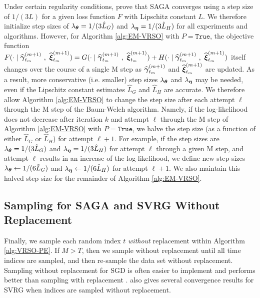 Under certain regularity conditions, \citet{Defazio:2014} prove that SAGA converges using a step size of $1/(3L)$ for a given loss function $F$ with Lipschitz constant $L$. We therefore initialize step sizes of $\lambda_{\boldsymbol{\theta}} = 1/(3 \hat L_G)$ and $\lambda_{\boldsymbol{\eta}} = 1/(3 \hat L_H)$ for all experiments and algorithms. However, for Algorithm \ref{alg:EM-VRSO} with $P = \texttt{True}$, the objective function $F(\cdot \mid \widehat {\boldsymbol{\gamma}}_{t_m}^{(m+1)} ~,~ \widehat {\boldsymbol{\xi}}_{t_m}^{(m+1)}) = G(\cdot \mid \widehat {\boldsymbol{\gamma}}_{t_m}^{(m+1)} ~,~ \widehat {\boldsymbol{\xi}}_{t_m}^{(m+1)}) + H(\cdot \mid \widehat {\boldsymbol{\gamma}}_{t_m}^{(m+1)} ~,~ \widehat {\boldsymbol{\xi}}_{t_m}^{(m+1)})$ itself changes over the course of a single M step as $\widehat {\boldsymbol{\gamma}}_{t_m}^{(m+1)}$ and $\widehat {\boldsymbol{\xi}}_{t_m}^{(m+1)}$ are updated. As a result, more conservative (i.e. smaller) step sizes $\lambda_{\boldsymbol{\theta}}$ and $\lambda_{\boldsymbol{\eta}}$ may be needed, even if the Lipschitz constant estimates $\hat L_G$ and $\hat L_H$ are accurate. We therefore allow Algorithm \ref{alg:EM-VRSO} to change the step size after each attempt $\ell$ through the M step of the Baum-Welch algorithm. Namely, if the log-likelihood does not decrease after iteration $k$ and attempt $\ell$ through the M step of Algorithm \ref{alg:EM-VRSO} with $P = \texttt{True}$, we halve the step size (as a function of either $\hat L_G$ or $\hat L_H$) for attempt $\ell+1$. For example, if the step sizes are $\lambda_{\boldsymbol{\theta}} = 1/(3 \hat L_G)$ and $\lambda_{\boldsymbol{\eta}} = 1/(3 \hat L_H)$ for attempt $\ell$ through a given M step, and attempt $\ell$ results in an increase of the log-likelihood, we define new step-sizes $\lambda_{\boldsymbol{\theta}} \leftarrow 1/(6 \hat L_G)$ and $\lambda_{\boldsymbol{\eta}} \leftarrow 1/(6 \hat L_H)$ for attempt $\ell+1$. We also maintain this halved step size for the remainder of Algorithm \ref{alg:EM-VRSO}.

\subsection{Sampling for SAGA and SVRG Without Replacement}
\label{subsec:wo_replacement}

Finally, we sample each random index $t$ \textit{without} replacement within Algorithm \ref{alg:VRSO-PE}. If $M > T$, then we sample without replacement until all time indices are sampled, and then re-sample the data set without replacement. Sampling without replacement for SGD is often easier to implement and performs better than sampling with replacement \citep{Gurbuzbalaban:2015}. \citet{Ohad:2016} also gives several convergence results for SVRG when indices are sampled without replacement.